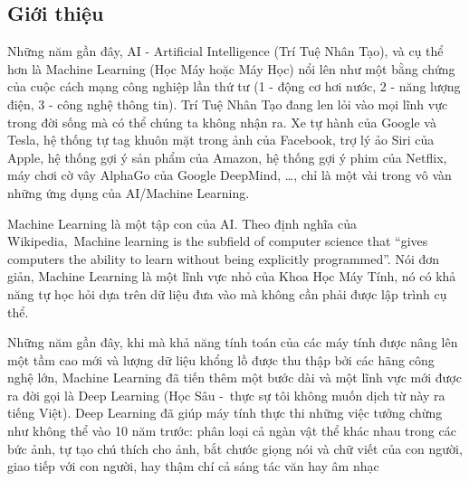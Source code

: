 \subsection{Giới thiệu}
Những năm gần đây, AI - Artificial Intelligence (Trí Tuệ Nhân Tạo), và cụ thể hơn là Machine Learning (Học Máy hoặc Máy Học) nổi lên như một bằng chứng của cuộc cách mạng công nghiệp lần thứ tư (1 - động cơ hơi nước, 2 - năng lượng điện, 3 - công nghệ thông tin). 
Trí Tuệ Nhân Tạo đang len lỏi vào mọi lĩnh vực trong đời sống mà có thể chúng ta không nhận ra. 
Xe tự hành của Google và Tesla, hệ thống tự tag khuôn mặt trong ảnh của Facebook, trợ lý ảo Siri của Apple, hệ thống gợi ý sản phẩm của Amazon, hệ thống gợi ý phim của Netflix, máy chơi cờ vây AlphaGo của Google DeepMind, …, chỉ là một vài trong vô vàn những ứng dụng của AI/Machine Learning.
\par
Machine Learning là một tập con của AI. Theo định nghĩa của Wikipedia, Machine learning is the subfield of computer science that “gives computers the ability to learn without being explicitly programmed”. 
Nói đơn giản, Machine Learning là một lĩnh vực nhỏ của Khoa Học Máy Tính, nó có khả năng tự học hỏi dựa trên dữ liệu đưa vào mà không cần phải được lập trình cụ thể.
\par
Những năm gần đây, khi mà khả năng tính toán của các máy tính được nâng lên một tầm cao mới và lượng dữ liệu khổng lồ được thu thập bởi các hãng công nghệ lớn, Machine Learning đã tiến thêm một bước dài và một lĩnh vực mới được ra đời gọi là Deep Learning (Học Sâu - thực sự tôi không muốn dịch từ này ra tiếng Việt). 
Deep Learning đã giúp máy tính thực thi những việc tưởng chừng như không thể vào 10 năm trước: phân loại cả ngàn vật thể khác nhau trong các bức ảnh, tự tạo chú thích cho ảnh, bắt chước giọng nói và chữ viết của con người, giao tiếp với con người, hay thậm chí cả sáng tác văn hay âm nhạc
